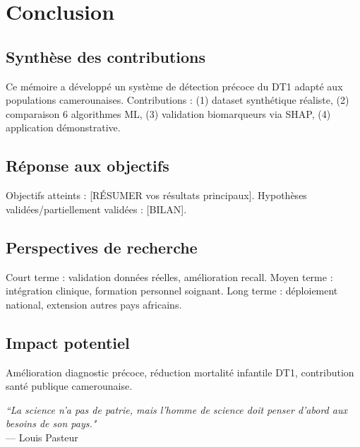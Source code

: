 \chapter{Conclusion}
\label{chap:conclusion}

\section{Synthèse des contributions}

Ce mémoire a développé un système de détection précoce du DT1 adapté aux populations camerounaises.
Contributions : (1) dataset synthétique réaliste, (2) comparaison 6 algorithmes ML, (3) validation biomarqueurs via SHAP, (4) application démonstrative.

\section{Réponse aux objectifs}

Objectifs atteints : [RÉSUMER vos résultats principaux].
Hypothèses validées/partiellement validées : [BILAN].

\section{Perspectives de recherche}

Court terme : validation données réelles, amélioration recall.
Moyen terme : intégration clinique, formation personnel soignant.
Long terme : déploiement national, extension autres pays africains.

\section{Impact potentiel}

Amélioration diagnostic précoce, réduction mortalité infantile DT1, contribution santé publique camerounaise.

\vspace{1cm}

\begin{center}
\textit{``La science n'a pas de patrie, mais l'homme de science doit penser d'abord aux besoins de son pays."}\\
--- Louis Pasteur
\end{center}
